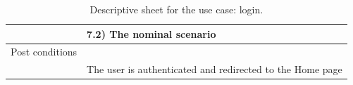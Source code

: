 \documentclass[]{uc2pfecaneva}
\begin{document}
\begin{table}[h]
\begin{tabularx}{\textwidth}{|l|X|}
		                      & \hspace{4mm}7.2) The nominal scenario                                                                                                                                \\ \hline
		Post conditions       &                                                                                                                                                                      \\
		                      & The user is authenticated and redirected to the Home page                                                                                                            \\ \hline
	\end{tabularx}
	\caption{Descriptive sheet for the use case: login.}
	\label{table:1}
\end{table}
\clearpage
\end{document}

